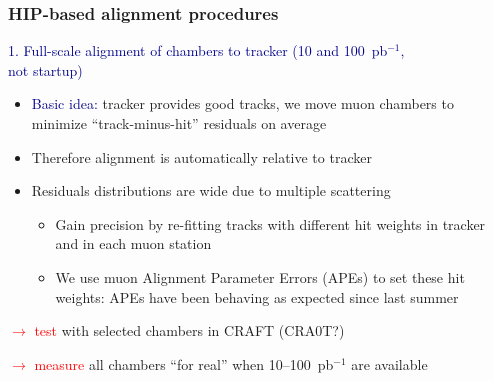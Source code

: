 \documentclass[compress]{beamer}
\begin{document}

\begin{frame}
\frametitle{HIP-based alignment procedures}
\textcolor{darkblue}{1. Full-scale alignment of chambers to tracker (10 and 100~pb$^{-1}$, \\ \hfill not startup)}
\begin{itemize}
\item \textcolor{darkblue}{Basic idea:} tracker provides good tracks, we move
muon chambers to minimize ``track-minus-hit'' residuals on average
\item Therefore alignment is automatically relative to tracker
\item Residuals distributions are wide due to multiple scattering
\begin{itemize}
\item Gain precision by re-fitting tracks with different hit weights
in tracker and in each muon station
\item We use muon Alignment Parameter Errors (APEs) to set these
hit weights: APEs have been behaving as expected since last summer
\end{itemize}
\end{itemize}

\vspace{0.25 cm}
\textcolor{red}{$\to$ test} with selected chambers in CRAFT (CRA0T?)

\vspace{0.25 cm}
\textcolor{red}{$\to$ measure} all chambers ``for real'' when 10--100~pb$^{-1}$ are available
\end{frame}
\end{document}
